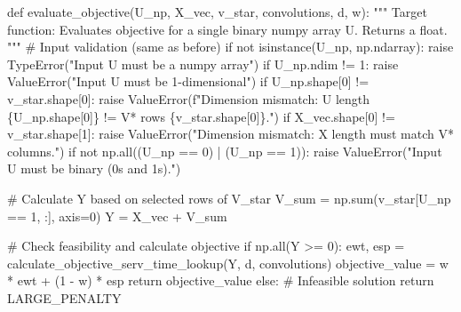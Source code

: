 \documentclass[
  letterpaper,
  DIV=11,
  numbers=noendperiod]{scrartcl}
\newenvironment{Shaded}{\begin{snugshade}}{\end{snugshade}}
\newcommand{\BuiltInTok}[1]{\textcolor[rgb]{0.00,0.23,0.31}{#1}}
\newcommand{\CommentTok}[1]{\textcolor[rgb]{0.37,0.37,0.37}{#1}}
\newcommand{\ControlFlowTok}[1]{\textcolor[rgb]{0.00,0.23,0.31}{#1}}
\newcommand{\DecValTok}[1]{\textcolor[rgb]{0.68,0.00,0.00}{#1}}
\newcommand{\KeywordTok}[1]{\textcolor[rgb]{0.00,0.23,0.31}{#1}}
\newcommand{\NormalTok}[1]{\textcolor[rgb]{0.00,0.23,0.31}{#1}}
\newcommand{\OperatorTok}[1]{\textcolor[rgb]{0.37,0.37,0.37}{#1}}
\newcommand{\PreprocessorTok}[1]{\textcolor[rgb]{0.68,0.00,0.00}{#1}}
\newcommand{\SpecialCharTok}[1]{\textcolor[rgb]{0.37,0.37,0.37}{#1}}
\newcommand{\SpecialStringTok}[1]{\textcolor[rgb]{0.13,0.47,0.30}{#1}}
\newcommand{\StringTok}[1]{\textcolor[rgb]{0.13,0.47,0.30}{#1}}
\begin{document}
\begin{Shaded}
\begin{Highlighting}[]
\KeywordTok{def}\NormalTok{ evaluate\_objective(U\_np, X\_vec, v\_star, convolutions, d, w):}
    \CommentTok{"""}
\CommentTok{    Target function: Evaluates objective for a single binary numpy array U.}
\CommentTok{    Returns a float.}
\CommentTok{    """}
    \CommentTok{\# Input validation (same as before)}
    \ControlFlowTok{if} \KeywordTok{not} \BuiltInTok{isinstance}\NormalTok{(U\_np, np.ndarray):}
        \ControlFlowTok{raise} \PreprocessorTok{TypeError}\NormalTok{(}\StringTok{"Input U must be a numpy array"}\NormalTok{)}
    \ControlFlowTok{if}\NormalTok{ U\_np.ndim }\OperatorTok{!=} \DecValTok{1}\NormalTok{:}
         \ControlFlowTok{raise} \PreprocessorTok{ValueError}\NormalTok{(}\StringTok{"Input U must be 1{-}dimensional"}\NormalTok{)}
    \ControlFlowTok{if}\NormalTok{ U\_np.shape[}\DecValTok{0}\NormalTok{] }\OperatorTok{!=}\NormalTok{ v\_star.shape[}\DecValTok{0}\NormalTok{]:}
         \ControlFlowTok{raise} \PreprocessorTok{ValueError}\NormalTok{(}\SpecialStringTok{f"Dimension mismatch: U length }\SpecialCharTok{\{}\NormalTok{U\_np}\SpecialCharTok{.}\NormalTok{shape[}\DecValTok{0}\NormalTok{]}\SpecialCharTok{\}}\SpecialStringTok{ != V* rows }\SpecialCharTok{\{}\NormalTok{v\_star}\SpecialCharTok{.}\NormalTok{shape[}\DecValTok{0}\NormalTok{]}\SpecialCharTok{\}}\SpecialStringTok{."}\NormalTok{)}
    \ControlFlowTok{if}\NormalTok{ X\_vec.shape[}\DecValTok{0}\NormalTok{] }\OperatorTok{!=}\NormalTok{ v\_star.shape[}\DecValTok{1}\NormalTok{]:}
         \ControlFlowTok{raise} \PreprocessorTok{ValueError}\NormalTok{(}\StringTok{"Dimension mismatch: X length must match V* columns."}\NormalTok{)}
    \ControlFlowTok{if} \KeywordTok{not}\NormalTok{ np.}\BuiltInTok{all}\NormalTok{((U\_np }\OperatorTok{==} \DecValTok{0}\NormalTok{) }\OperatorTok{|}\NormalTok{ (U\_np }\OperatorTok{==} \DecValTok{1}\NormalTok{)):}
         \ControlFlowTok{raise} \PreprocessorTok{ValueError}\NormalTok{(}\StringTok{"Input U must be binary (0s and 1s)."}\NormalTok{)}

    \CommentTok{\# Calculate Y based on selected rows of V\_star}
\NormalTok{    V\_sum }\OperatorTok{=}\NormalTok{ np.}\BuiltInTok{sum}\NormalTok{(v\_star[U\_np }\OperatorTok{==} \DecValTok{1}\NormalTok{, :], axis}\OperatorTok{=}\DecValTok{0}\NormalTok{)}
\NormalTok{    Y }\OperatorTok{=}\NormalTok{ X\_vec }\OperatorTok{+}\NormalTok{ V\_sum}

    \CommentTok{\# Check feasibility and calculate objective}
    \ControlFlowTok{if}\NormalTok{ np.}\BuiltInTok{all}\NormalTok{(Y }\OperatorTok{\textgreater{}=} \DecValTok{0}\NormalTok{):}
\NormalTok{        ewt, esp }\OperatorTok{=}\NormalTok{ calculate\_objective\_serv\_time\_lookup(Y, d, convolutions)}
\NormalTok{        objective\_value }\OperatorTok{=}\NormalTok{ w }\OperatorTok{*}\NormalTok{ ewt }\OperatorTok{+}\NormalTok{ (}\DecValTok{1} \OperatorTok{{-}}\NormalTok{ w) }\OperatorTok{*}\NormalTok{ esp}
        \ControlFlowTok{return}\NormalTok{ objective\_value}
    \ControlFlowTok{else}\NormalTok{:}
        \CommentTok{\# Infeasible solution}
        \ControlFlowTok{return}\NormalTok{ LARGE\_PENALTY}


\end{Highlighting}
\end{Shaded}
\end{document}
